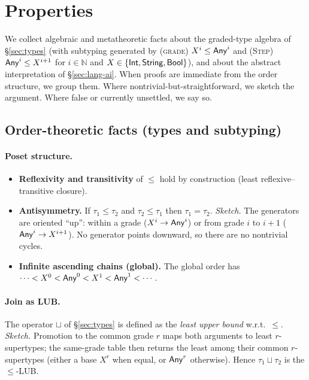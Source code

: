 \section{Properties}
\label{sec:properties}

We collect algebraic and metatheoretic facts about the graded-type algebra of \S\ref{sec:types}
(with subtyping generated by \textsc{(grade)} $X^{i}\le \mathsf{Any}^{i}$ and \textsc{(Step)} $\mathsf{Any}^{i}\le X^{i+1}$ for $i\in\mathbb{N}$ and $X\in\{\mathsf{Int},\mathsf{String},\mathsf{Bool}\}$),
and about the abstract interpretation of \S\ref{sec:lang-ai}.
When proofs are immediate from the order structure, we group them.
Where nontrivial-but-straightforward, we sketch the argument.
Where false or currently unsettled, we say so.

\subsection{Order-theoretic facts (types and subtyping)}

\paragraph{Poset structure.}
\begin{itemize}
\item \textbf{Reflexivity and transitivity} of $\le$ hold by construction (least reflexive–transitive closure).
\item \textbf{Antisymmetry.} If $\tau_1\le \tau_2$ and $\tau_2\le \tau_1$ then $\tau_1=\tau_2$.
\emph{Sketch.} The generators are oriented “up”: within a grade ($X^{i}\to\mathsf{Any}^{i}$) or from grade $i$ to $i{+}1$ ($\mathsf{Any}^{i}\to X^{i+1}$). No generator points downward, so there are no nontrivial cycles.
\item \textbf{Infinite ascending chains (global).} The global order has $\cdots < X^{0} < \mathsf{Any}^{0} < X^{1} < \mathsf{Any}^{1} < \cdots$.
\end{itemize}

\paragraph{Join as LUB.}
The operator $\sqcup$ of \S\ref{sec:types} is defined as the \emph{least upper bound} w.r.t.\ $\le$.
\emph{Sketch.} Promotion to the common grade $r$ maps both arguments to least $r$-supertypes; the same-grade table then returns the least among their common $r$-supertypes (either a base $X^{r}$ when equal, or $\mathsf{Any}^{r}$ otherwise). Hence $\tau_1\sqcup\tau_2$ is the $\le$-LUB.

